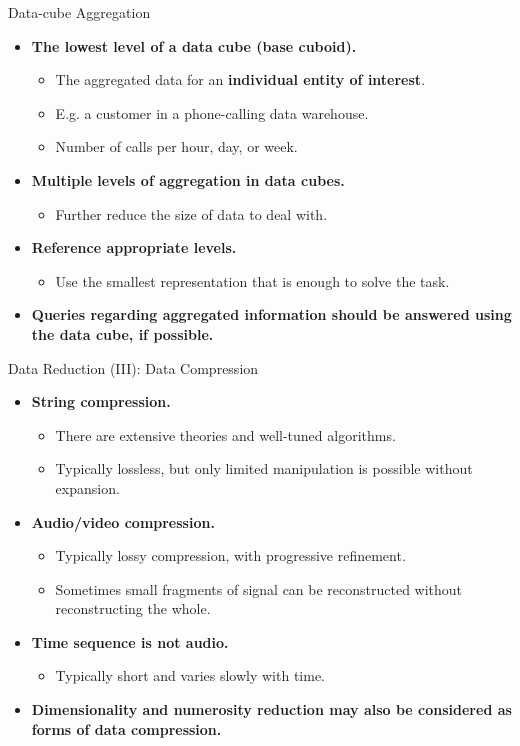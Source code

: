 \begin{frame}{Data-cube Aggregation}
	\begin{itemize}
		\item \textbf{The lowest level of a data cube (base cuboid).}
		      \begin{itemize}
			      \item The aggregated data for an \textbf{individual entity of
				            interest}.
			      \item E.g. a customer in a phone-calling data warehouse.
			      \item Number of calls per hour, day, or week.
		      \end{itemize}
		\item \textbf{Multiple levels of aggregation in data cubes.}
		      \begin{itemize}
			      \item Further reduce the size of data to deal with.
		      \end{itemize}
		\item \textbf{Reference appropriate levels.}
		      \begin{itemize}
			      \item Use the smallest representation that is enough to solve
			            the task.
		      \end{itemize}
		\item \textbf{Queries regarding aggregated information should be
			      answered using the data cube, if possible.}
	\end{itemize}
\end{frame}

\begin{frame}{Data Reduction (III): Data Compression}
	\begin{itemize}
		\item \textbf{String compression.}
		      \begin{itemize}
			      \item There are extensive theories and well-tuned algorithms.
			      \item Typically lossless, but only limited manipulation is possible
			            without expansion.
		      \end{itemize}
		\item \textbf{Audio/video compression.}
		      \begin{itemize}
			      \item Typically lossy compression, with progressive refinement.
			      \item Sometimes small fragments of signal can be reconstructed
			            without reconstructing the whole.
		      \end{itemize}
		\item \textbf{Time sequence is not audio.}
		      \begin{itemize}
			      \item Typically short and varies slowly with time.
		      \end{itemize}
		\item \textbf{Dimensionality and numerosity reduction may also be
			      considered as forms of data compression.}
	\end{itemize}
\end{frame}
